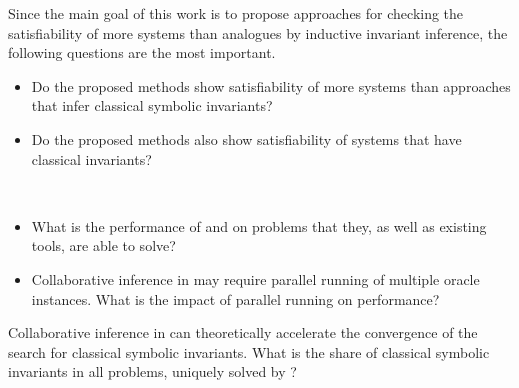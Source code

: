 \begin{resquest}\label{rq:conv}
Since the main goal of this work is to propose approaches for checking the satisfiability of more systems than analogues by inductive invariant inference, the following questions are the most important.
\begin{itemize}
    \item Do the proposed methods show satisfiability of more systems than approaches that infer classical symbolic invariants?
    \item Do the proposed methods also show satisfiability of systems that have classical invariants?
\end{itemize}
\end{resquest}

\begin{resquest}[Performance]\label{rq:perf}
$ $

\begin{itemize}
    \item What is the performance of \theringen{} and \ringenSync{} on problems that they, as well as existing tools, are able to solve?
    \item Collaborative inference in \theringenCICI{} may require parallel running of multiple oracle instances. What is the impact of parallel running on performance?
\end{itemize}
\end{resquest}

\begin{resquest}\label{rq:char}
Collaborative inference in \theringenCICI{} can theoretically accelerate the convergence of the search for classical symbolic invariants. What is the share of classical symbolic invariants in all problems, uniquely solved by \theringenCICI{}?
\end{resquest}


